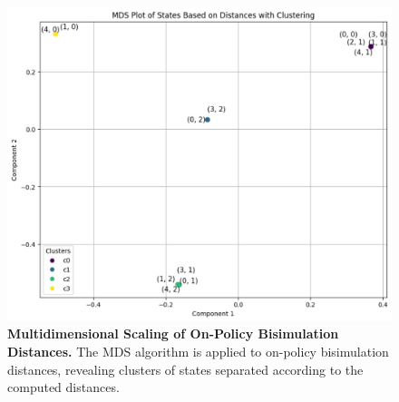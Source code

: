 \begin{figure}[h]
    \centering
    \includegraphics[width=0.9\linewidth]{Figures/clustering.jpg}
    \caption[Multidimensional Scaling of On-policy Bisimulation Distances]{\textbf{Multidimensional Scaling of On-Policy Bisimulation Distances.} The MDS algorithm is applied to on-policy bisimulation distances, revealing clusters of states separated according to the computed distances.}
    \label{fig:clustering}
\end{figure}



